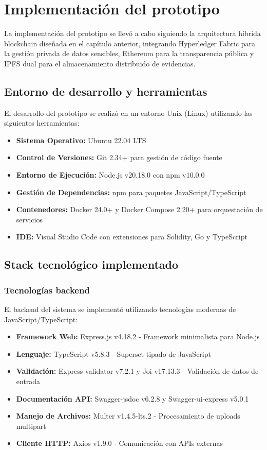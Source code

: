 \section{Implementación del prototipo}

La implementación del prototipo se llevó a cabo siguiendo la arquitectura híbrida blockchain diseñada en el capítulo anterior, integrando Hyperledger Fabric para la gestión privada de datos sensibles, Ethereum para la transparencia pública y IPFS dual para el almacenamiento distribuido de evidencias.

\subsection{Entorno de desarrollo y herramientas}

El desarrollo del prototipo se realizó en un entorno Unix (Linux) utilizando las siguientes herramientas:

\begin{itemize}
    \item \textbf{Sistema Operativo:} Ubuntu 22.04 LTS
    \item \textbf{Control de Versiones:} Git 2.34+ para gestión de código fuente
    \item \textbf{Entorno de Ejecución:} Node.js v20.18.0 con npm v10.0.0
    \item \textbf{Gestión de Dependencias:} npm para paquetes JavaScript/TypeScript
    \item \textbf{Contenedores:} Docker 24.0+ y Docker Compose 2.20+ para orquestación de servicios
    \item \textbf{IDE:} Visual Studio Code con extensiones para Solidity, Go y TypeScript
\end{itemize}

\subsection{Stack tecnológico implementado}

\subsubsection{Tecnologías backend}

El backend del sistema se implementó utilizando tecnologías modernas de JavaScript/TypeScript:

\begin{itemize}
    \item \textbf{Framework Web:} Express.js v4.18.2 - Framework minimalista para Node.js
    \item \textbf{Lenguaje:} TypeScript v5.8.3 - Superset tipado de JavaScript
    \item \textbf{Validación:} Express-validator v7.2.1 y Joi v17.13.3 - Validación de datos de entrada
    \item \textbf{Documentación API:} Swagger-jsdoc v6.2.8 y Swagger-ui-express v5.0.1
    \item \textbf{Manejo de Archivos:} Multer v1.4.5-lts.2 - Procesamiento de uploads multipart
    \item \textbf{Cliente HTTP:} Axios v1.9.0 - Comunicación con APIs externas
\end{itemize}

